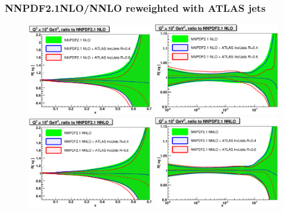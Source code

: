 \documentclass[10pt]{beamer}
\begin{document}
\begin{frame}
\frametitle{NNPDF2.1NLO/NNLO reweighted with ATLAS jets}
\begin{figure}[h]
\begin{center}
\includegraphics[width=0.49\textwidth]{xg_Q2_10000_lin-atlasnloR.eps}
\includegraphics[width=0.49\textwidth]{xg_Q2_10000_log-atlasnloR.eps}\\
\includegraphics[width=0.49\textwidth]{xg_Q2_10000_lin-atlasR.eps}
\includegraphics[width=0.49\textwidth]{xg_Q2_10000_log-atlasR.eps}
\label{pdfcomp-jets}
\end{center}
\end{figure}
\end{frame}
\end{document}
